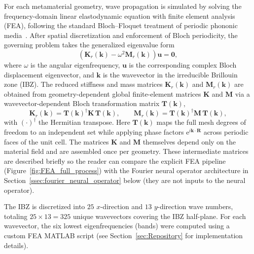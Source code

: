 \documentclass[preprint,review,12pt,numafflabel]{elsarticle}
\begin{document}
For each metamaterial geometry, wave propagation is simulated by solving the frequency-domain linear elastodynamic equation with finite element analysis (FEA), following the standard Bloch--Floquet treatment of periodic phononic media~\cite{hussein2014dynamics,kushwaha1993acoustic}. After spatial discretization and enforcement of Bloch periodicity, the governing problem takes the generalized eigenvalue form
\begin{equation}
\label{eqn:eig_PDE}
\left( \mathbf{K}_r(\mathbf{k}) - \omega^2 \mathbf{M}_r(\mathbf{k}) \right) \mathbf{u} = \mathbf{0},
\end{equation}
where $\omega$ is the angular eigenfrequency, $\mathbf{u}$ is the corresponding complex Bloch displacement eigenvector, and $\mathbf{k}$ is the wavevector in the irreducible Brillouin zone (IBZ). The reduced stiffness and mass matrices $\mathbf{K}_r(\mathbf{k})$ and $\mathbf{M}_r(\mathbf{k})$ are obtained from geometry-dependent global finite-element matrices $\mathbf{K}$ and $\mathbf{M}$ via a wavevector-dependent Bloch transformation matrix $\mathbf{T}(\mathbf{k})$,
\begin{equation}
\label{eqn:reduced_KM}
\mathbf{K}_r(\mathbf{k}) = \mathbf{T}(\mathbf{k})^{\dagger}\mathbf{K}\,\mathbf{T}(\mathbf{k}),
\qquad
\mathbf{M}_r(\mathbf{k}) = \mathbf{T}(\mathbf{k})^{\dagger}\mathbf{M}\,\mathbf{T}(\mathbf{k}),
\end{equation}
with $(\cdot)^{\dagger}$ the Hermitian transpose. Here $\mathbf{T}(\mathbf{k})$ maps the full mesh degrees of freedom to an independent set while applying phase factors $\mathrm{e}^{i\mathbf{k}\cdot\mathbf{R}}$ across periodic faces of the unit cell. The matrices $\mathbf{K}$ and $\mathbf{M}$ themselves depend only on the material field and are assembled once per geometry. These intermediate matrices are described briefly so the reader can compare the explicit FEA pipeline (Figure~\ref{fig:FEA_full_process}) with the Fourier neural operator architecture in Section~\ref{ssec:fourier_neural_operator} below (they are not inputs to the neural operator).

The IBZ is discretized into $25$ $x$-direction and $13$ $y$-direction wave numbers, totaling $25 \times 13 = 325$ unique wavevectors covering the IBZ half-plane. For each wavevector, the six lowest eigenfrequencies (bands) were computed using a custom FEA MATLAB script (see Section~\ref{sec:Repository} for implementation details). 
\end{document}
